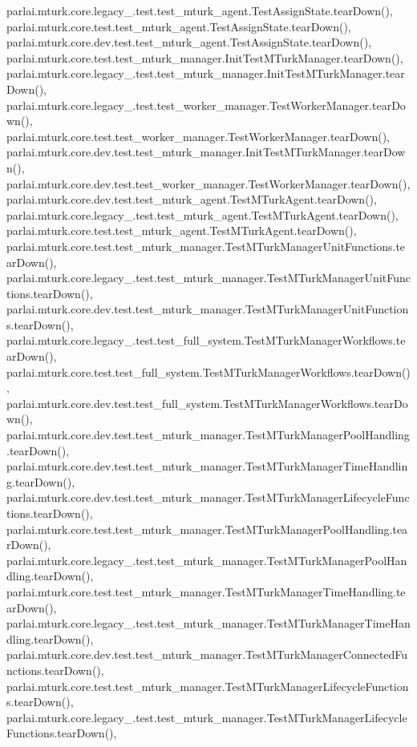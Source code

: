 parlai.\+mturk.\+core.\+legacy\+\_.\+test.\+test\+\_\+mturk\+\_\+agent.\+Test\+Assign\+State.\+tear\+Down(), parlai.\+mturk.\+core.\+test.\+test\+\_\+mturk\+\_\+agent.\+Test\+Assign\+State.\+tear\+Down(), parlai.\+mturk.\+core.\+dev.\+test.\+test\+\_\+mturk\+\_\+agent.\+Test\+Assign\+State.\+tear\+Down(), parlai.\+mturk.\+core.\+test.\+test\+\_\+mturk\+\_\+manager.\+Init\+Test\+M\+Turk\+Manager.\+tear\+Down(), parlai.\+mturk.\+core.\+legacy\+\_.\+test.\+test\+\_\+mturk\+\_\+manager.\+Init\+Test\+M\+Turk\+Manager.\+tear\+Down(), parlai.\+mturk.\+core.\+legacy\+\_.\+test.\+test\+\_\+worker\+\_\+manager.\+Test\+Worker\+Manager.\+tear\+Down(), parlai.\+mturk.\+core.\+test.\+test\+\_\+worker\+\_\+manager.\+Test\+Worker\+Manager.\+tear\+Down(), parlai.\+mturk.\+core.\+dev.\+test.\+test\+\_\+mturk\+\_\+manager.\+Init\+Test\+M\+Turk\+Manager.\+tear\+Down(), parlai.\+mturk.\+core.\+dev.\+test.\+test\+\_\+worker\+\_\+manager.\+Test\+Worker\+Manager.\+tear\+Down(), parlai.\+mturk.\+core.\+dev.\+test.\+test\+\_\+mturk\+\_\+agent.\+Test\+M\+Turk\+Agent.\+tear\+Down(), parlai.\+mturk.\+core.\+legacy\+\_.\+test.\+test\+\_\+mturk\+\_\+agent.\+Test\+M\+Turk\+Agent.\+tear\+Down(), parlai.\+mturk.\+core.\+test.\+test\+\_\+mturk\+\_\+agent.\+Test\+M\+Turk\+Agent.\+tear\+Down(), parlai.\+mturk.\+core.\+test.\+test\+\_\+mturk\+\_\+manager.\+Test\+M\+Turk\+Manager\+Unit\+Functions.\+tear\+Down(), parlai.\+mturk.\+core.\+legacy\+\_.\+test.\+test\+\_\+mturk\+\_\+manager.\+Test\+M\+Turk\+Manager\+Unit\+Functions.\+tear\+Down(), parlai.\+mturk.\+core.\+dev.\+test.\+test\+\_\+mturk\+\_\+manager.\+Test\+M\+Turk\+Manager\+Unit\+Functions.\+tear\+Down(), parlai.\+mturk.\+core.\+legacy\+\_.\+test.\+test\+\_\+full\+\_\+system.\+Test\+M\+Turk\+Manager\+Workflows.\+tear\+Down(), parlai.\+mturk.\+core.\+test.\+test\+\_\+full\+\_\+system.\+Test\+M\+Turk\+Manager\+Workflows.\+tear\+Down(), parlai.\+mturk.\+core.\+dev.\+test.\+test\+\_\+full\+\_\+system.\+Test\+M\+Turk\+Manager\+Workflows.\+tear\+Down(), parlai.\+mturk.\+core.\+dev.\+test.\+test\+\_\+mturk\+\_\+manager.\+Test\+M\+Turk\+Manager\+Pool\+Handling.\+tear\+Down(), parlai.\+mturk.\+core.\+dev.\+test.\+test\+\_\+mturk\+\_\+manager.\+Test\+M\+Turk\+Manager\+Time\+Handling.\+tear\+Down(), parlai.\+mturk.\+core.\+dev.\+test.\+test\+\_\+mturk\+\_\+manager.\+Test\+M\+Turk\+Manager\+Lifecycle\+Functions.\+tear\+Down(), parlai.\+mturk.\+core.\+test.\+test\+\_\+mturk\+\_\+manager.\+Test\+M\+Turk\+Manager\+Pool\+Handling.\+tear\+Down(), parlai.\+mturk.\+core.\+legacy\+\_.\+test.\+test\+\_\+mturk\+\_\+manager.\+Test\+M\+Turk\+Manager\+Pool\+Handling.\+tear\+Down(), parlai.\+mturk.\+core.\+test.\+test\+\_\+mturk\+\_\+manager.\+Test\+M\+Turk\+Manager\+Time\+Handling.\+tear\+Down(), parlai.\+mturk.\+core.\+legacy\+\_.\+test.\+test\+\_\+mturk\+\_\+manager.\+Test\+M\+Turk\+Manager\+Time\+Handling.\+tear\+Down(), parlai.\+mturk.\+core.\+dev.\+test.\+test\+\_\+mturk\+\_\+manager.\+Test\+M\+Turk\+Manager\+Connected\+Functions.\+tear\+Down(), parlai.\+mturk.\+core.\+test.\+test\+\_\+mturk\+\_\+manager.\+Test\+M\+Turk\+Manager\+Lifecycle\+Functions.\+tear\+Down(), parlai.\+mturk.\+core.\+legacy\+\_.\+test.\+test\+\_\+mturk\+\_\+manager.\+Test\+M\+Turk\+Manager\+Lifecycle\+Functions.\+tear\+Down(), 